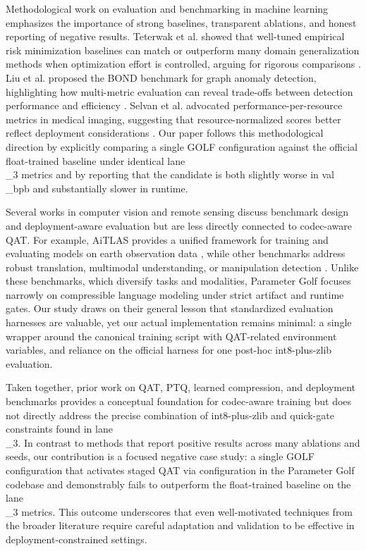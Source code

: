 \documentclass{article}
\begin{document}
Methodological work on evaluation and benchmarking in machine learning emphasizes the importance of strong baselines, transparent ablations, and honest reporting of negative results. Teterwak et al. showed that well-tuned empirical risk minimization baselines can match or outperform many domain generalization methods when optimization effort is controlled, arguing for rigorous comparisons \cite{teterwak2023improved}. Liu et al. proposed the BOND benchmark for graph anomaly detection, highlighting how multi-metric evaluation can reveal trade-offs between detection performance and efficiency \cite{liu2022bond}. Selvan et al. advocated performance-per-resource metrics in medical imaging, suggesting that resource-normalized scores better reflect deployment considerations \cite{selvan2024pepr}. Our paper follows this methodological direction by explicitly comparing a single GOLF configuration against the official float-trained baseline under identical lane\\_3 metrics and by reporting that the candidate is both slightly worse in val\\_bpb and substantially slower in runtime.

Several works in computer vision and remote sensing discuss benchmark design and deployment-aware evaluation but are less directly connected to codec-aware QAT. For example, AiTLAS provides a unified framework for training and evaluating models on earth observation data \cite{dimitrovski2023aitlas}, while other benchmarks address robust translation, multimodal understanding, or manipulation detection \cite{salesky2021robust, li2024vrsbench, ma2024imdlbenco}. Unlike these benchmarks, which diversify tasks and modalities, Parameter Golf focuses narrowly on compressible language modeling under strict artifact and runtime gates. Our study draws on their general lesson that standardized evaluation harnesses are valuable, yet our actual implementation remains minimal: a single wrapper around the canonical training script with QAT-related environment variables, and reliance on the official harness for one post-hoc int8-plus-zlib evaluation.

Taken together, prior work on QAT, PTQ, learned compression, and deployment benchmarks provides a conceptual foundation for codec-aware training but does not directly address the precise combination of int8-plus-zlib and quick-gate constraints found in lane\\_3. In contrast to methods that report positive results across many ablations and seeds, our contribution is a focused negative case study: a single GOLF configuration that activates staged QAT via configuration in the Parameter Golf codebase and demonstrably fails to outperform the float-trained baseline on the lane\\_3 metrics. This outcome underscores that even well-motivated techniques from the broader literature require careful adaptation and validation to be effective in deployment-constrained settings.
\end{document}
